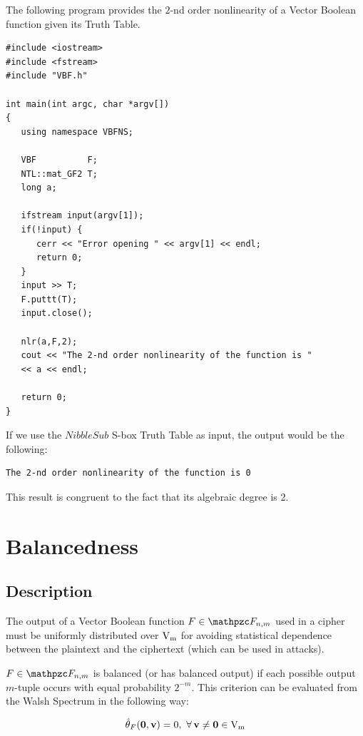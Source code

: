 \begin{example}
The following program provides the $2$-nd order nonlinearity of a Vector Boolean function given its Truth Table.

\begin{verbatim}
#include <iostream>
#include <fstream>
#include "VBF.h"

int main(int argc, char *argv[])
{
   using namespace VBFNS;

   VBF          F;
   NTL::mat_GF2 T;
   long a;

   ifstream input(argv[1]);
   if(!input) {
      cerr << "Error opening " << argv[1] << endl;
      return 0;
   }
   input >> T;
   F.puttt(T);
   input.close();

   nlr(a,F,2);
   cout << "The 2-nd order nonlinearity of the function is "
   << a << endl;

   return 0;
}
\end{verbatim}

If we use the $NibbleSub$ S-box Truth Table as input, the output would be the following:

\begin{verbatim}
The 2-nd order nonlinearity of the function is 0
\end{verbatim}

This result is congruent to the fact that its algebraic degree is 2.
\end{example}

\section{Balancedness}\label{sec:balancedness}

\subsection{Description}

The output of a Vector Boolean function $F \in \funct{F}_{n,m}$ used in a cipher must be uniformly distributed over $\gf{V_m}$ for avoiding statistical dependence between the plaintext and the ciphertext (which can be used in attacks).

\begin{definition}
$F \in \funct{F}_{n,m}$ is balanced (or has balanced output) if each possible output $m$-tuple
  occurs with equal probability $2^{-m}$. This criterion can be evaluated from the
  Walsh Spectrum in the following way: 

\begin{equation}
\walsh{\theta}_F(\vec{0},\vec{v})= 0, \ \fa \vec{v} \neq \vec{0} \in \gf{V_m}
\end{equation}
\end{definition}

